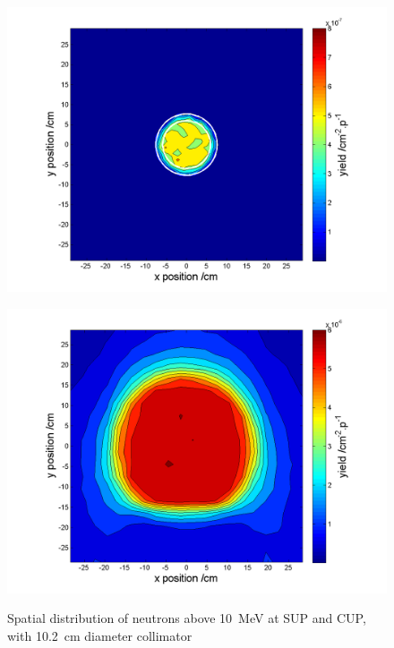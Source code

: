\documentclass[peerreviewca,11pt,a4paper]{IEEEtran}
\let\MYoriglatexcaption\caption
\renewcommand{\caption}[2][\relax]{\MYoriglatexcaption[#2]{#2}}
\begin{document}
\begin{figure}[t]
    \begin{minipage}{\columnwidth}
        \includegraphics[width=0.9\columnwidth]{SUP10ColSpatialDistribution10MeVRADECS.png}
        \label{fig:SUPDensity}
    \end{minipage}
    \begin{minipage}{\columnwidth}
        \includegraphics[width=0.9\columnwidth]{CUP10ColSpatialDistribution10MeV.png}
        \label{fig:CUPDensity}
    \end{minipage}
    \caption{
        Spatial distribution of neutrons above \SI{10}{\MeV} at SUP and CUP, with \SI{10.2}{\cm} diameter collimator
    }
\end{figure}
\end{document}
